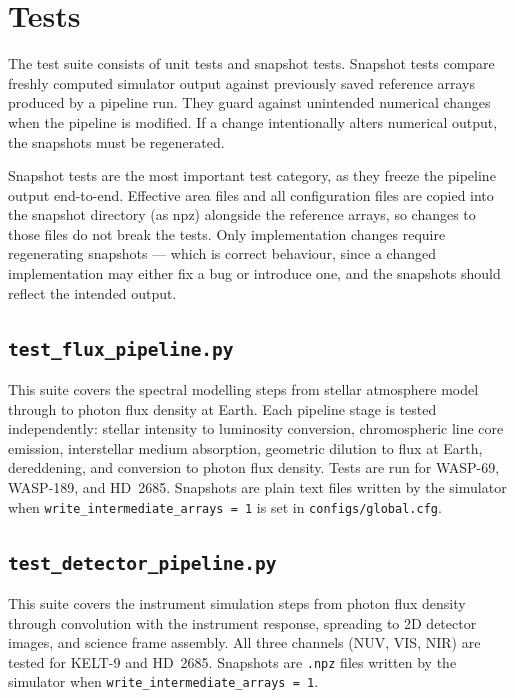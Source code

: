 \newpage
\section{Tests}

The test suite consists of unit tests and snapshot tests. Snapshot tests compare freshly computed simulator output against previously saved reference arrays produced by a pipeline run. They guard against unintended numerical changes when the pipeline is modified. If a change intentionally alters numerical output, the snapshots must be regenerated.

Snapshot tests are the most important test category, as they freeze the pipeline output end-to-end. Effective area files and all configuration files are copied into the snapshot directory (as npz) alongside the reference arrays, so changes to those files do not break the tests. Only implementation changes require regenerating snapshots — which is correct behaviour, since a changed implementation may either fix a bug or introduce one, and the snapshots should reflect the intended output.

\subsection{\texttt{test\_flux\_pipeline.py}}

This suite covers the spectral modelling steps from stellar atmosphere model
through to photon flux density at Earth. Each pipeline stage is tested
independently: stellar intensity to luminosity conversion, chromospheric line
core emission, interstellar medium absorption, geometric dilution to flux at
Earth, dereddening, and conversion to photon flux density. Tests are run for
WASP-69, WASP-189, and HD~2685. Snapshots are plain text files written by the
simulator when \texttt{write\_intermediate\_arrays = 1} is set in
\texttt{configs/global.cfg}.

\subsection{\texttt{test\_detector\_pipeline.py}}

This suite covers the instrument simulation steps from photon flux density
through convolution with the instrument response, spreading to 2D detector
images, and science frame assembly. All three channels (NUV, VIS, NIR) are
tested for KELT-9 and HD~2685. Snapshots are \texttt{.npz} files written by
the simulator when \texttt{write\_intermediate\_arrays = 1}.


